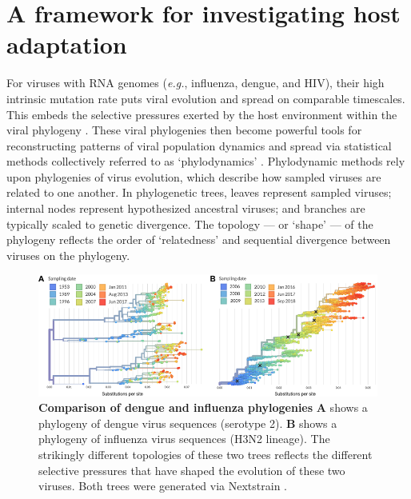 \section{A framework for investigating host adaptation}
For viruses with RNA genomes (\textit{e.g.}, influenza, dengue, and HIV), their high intrinsic mutation rate puts viral evolution and spread on comparable timescales.
This embeds the selective pressures exerted by the host environment within the viral phylogeny \citep{bedford2011strength}.
These viral phylogenies then become powerful tools for reconstructing patterns of viral population dynamics and spread via statistical methods collectively referred to as `phylodynamics' \citep{grenfell2004unifying}.
Phylodynamic methods rely upon phylogenies of virus evolution, which describe how sampled viruses are related to one another.
In phylogenetic trees, leaves represent sampled viruses; internal nodes represent hypothesized ancestral viruses; and branches are typically scaled to genetic divergence.
The topology --- or `shape' --- of the phylogeny reflects the order of `relatedness' and sequential divergence between viruses on the phylogeny.

\begin{figure}[ht!]
  \begin{centering}
    \includegraphics[width=\linewidth]{./png/dengue_vs_influenza.png}
  	\caption[Comparison of dengue and influenza phylogenies]{\textbf{Comparison of dengue and influenza phylogenies }
\textbf{A} shows a phylogeny of dengue virus sequences (serotype 2).
\textbf{B} shows a phylogeny of influenza virus sequences (H3N2 lineage).
The strikingly different topologies of these two trees reflects the different selective pressures that have shaped the evolution of these two viruses.
Both trees were generated via Nextstrain \citep{hadfield2017nextstrain}.
}
  	\label{dengue_vs_influenza}
  \end{centering}
\end{figure}

